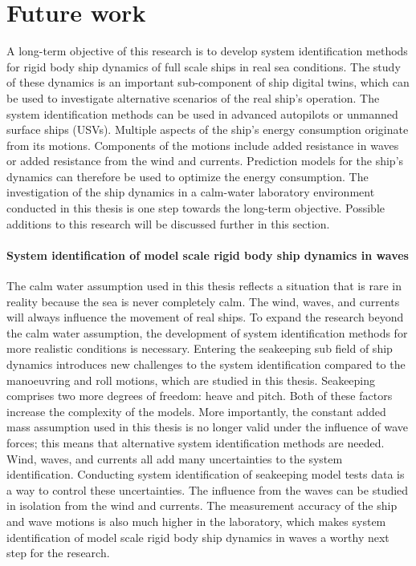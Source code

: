 \chapter{Future work\label{ch:future_work}}
A long-term objective of this research is to develop system identification methods for rigid body ship dynamics of full scale ships in real sea conditions. The study of these dynamics is an important sub-component of ship digital twins, which can be used to investigate alternative scenarios of the real ship's operation. The system identification methods can be used in advanced autopilots or unmanned surface ships (USVs). Multiple aspects of the ship's energy consumption originate from its motions. Components of the motions include added resistance in waves or added resistance from the wind and currents. Prediction models for the ship's dynamics can therefore be used to optimize the energy consumption. The investigation of the ship dynamics in a calm-water laboratory environment conducted in this thesis is one step towards the long-term objective. Possible additions to this research will be discussed further in this section.  

\subsubsection*{\normalfont \color{black} \textbf{System identification of model scale rigid body ship dynamics in waves}}
The calm water assumption used in this thesis reflects a situation that is rare in reality because the sea is never completely calm. The wind, waves, and currents will always influence the movement of real ships. To expand the research beyond the calm water assumption, the development of system identification methods for more realistic conditions is necessary. Entering the seakeeping sub field of ship dynamics introduces new challenges to the system identification compared to the manoeuvring and roll motions, which are studied in this thesis. Seakeeping comprises two more degrees of freedom: heave and pitch. Both of these factors increase the complexity of the models. More importantly, the constant added mass assumption used in this thesis is no longer valid under the influence of wave forces; this means that alternative system identification methods are needed. Wind, waves, and currents all add many uncertainties to the system identification. Conducting system identification of seakeeping model tests data is a way to control these uncertainties. The influence from the waves can be studied in isolation from the wind and currents. The measurement accuracy of the ship and wave motions is also much higher in the laboratory, which makes system identification of model scale rigid body ship dynamics in waves a worthy next step for the research.  

